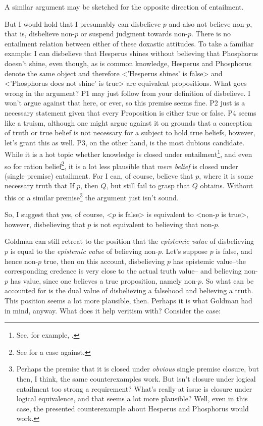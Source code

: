 \documentclass[12pt,numbers=noenddot]{scrartcl}
\begin{document}
A similar argument may be sketched for the opposite direction of entailment.

But I would hold that I presumably can disbelieve $p$ and also not believe non-$p$, that is, disbelieve non-$p$ or suspend judgment towards non-$p$. There is no entailment relation between either of these doxastic attitudes. To take a familiar example: I can disbelieve that Hesperus shines without believing that Phosphorus doesn't shine, even though, as is common knowledge, Hesperus and Phosphorus denote the same object and therefore <'Hesperus shines' is false> and <'Phosphorus does not shine' is true> are equivalent propositions. What goes wrong in the argument? P1 may just follow from your definition of disbelieve. I won't argue against that here, or ever, so this premise seems fine. P2 just is a necessary statement given that every Proposition is either true or false. P4 seems like a truism, although one might argue against it on grounds that a conception of truth or true belief is not necessary for a subject to hold true beliefs, however, let's grant this as well. P3, on the other hand, is the most dubious candidate. While it is a hot topic whether knowledge is closed under entailment\footnote{See, for example, \textcite{Dretske2005-DREIKC}.}, and even so for ration belief\footnote{See \textcite{KyburgJr1970-KYBC-2} for a case against.}, it is a lot less plausible that \emph{mere belief} is closed under (single premise) entailment. For I can, of course, believe that $p$, where it is some necessary truth that If $p$, then $Q$, but still fail to grasp that $Q$ obtains. Without this or a similar premise\footnote{Perhaps the premise that it is closed under \emph{obvious} single premise closure, but then, I think, the same counterexamples work. But isn't closure under logical entailment too strong a requirement? What's really at issue is closure under logical equivalence, and that seems a lot more plausible? Well, even in this case, the presented counterexample about Hesperus and Phosphorus would work.} the argument just isn't sound.

So, I suggest that yes, of course, <$p$ is false> is equivalent to <non-$p$ is true>, however, disbelieving that $p$ is not equivalent to believing that non-$p$.

Goldman can still retreat to the position that the \emph{epistemic value} of disbelieving $p$ is equal to the \emph{epistemic value} of believing non-$p$. Let's suppose $p$ is false, and hence non-$p$ true, then on this account, disbelieving $p$ has epistemic value–the corresponding credence is very close to the actual truth value– and believing non-$p$ has value, since one believes a true proposition, namely non-$p$. So what can be accounted for is the dual value of disbelieving a falsehood and believing a truth. This position seems a lot more plausible, then. Perhaps it is what Goldman had in mind, anyway. What does it help veritism with? Consider the case:
\end{document}
